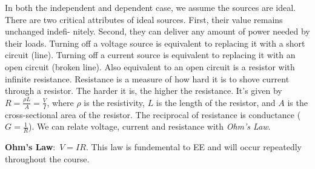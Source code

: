 \documentclass[nobib]{tufte-handout}
\newcommand{\defn}[2]{\noindent\textbf{#1}:\ #2}
\begin{document}
In both the independent and dependent case, we assume
the sources are ideal. There are two
critical attributes of ideal sources. First, their value remains unchanged indefi-
nitely. Second, they can deliver any amount of power needed by their loads.
Turning off a voltage source is equivalent to replacing it with a 
short circuit (line). Turning off a current source is equivalent to replacing it with an
open circuit (broken line). Also equivalent to an open
circuit is a resistor with infinite resistance. 
Resistance is a measure of how hard it is to shove current
through a resistor. The harder it is, the higher the
resistance. It's given by $R = \frac{\rho L}{A} = \frac{V}{I}$, where $\rho$ 
is the resistivity, $L$ is the length of the resistor, and $A$ is the 
cross-sectional area of the resistor. The reciprocal of
resistance is conductance ($G = \frac{1}{R}$). We can relate 
voltage, current and resistance with \emph{Ohm's Law}.

\defn{Ohm's Law}{$V = IR$.} This law is fundemental to EE and will
occur repeatedly throughout the course. 

\pagebreak 
\end{document}

